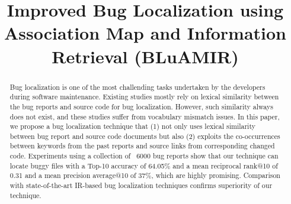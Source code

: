 \documentclass[conference]{IEEEtran}
\begin{document}
\title{Improved Bug Localization using Association Map and Information Retrieval (BLuAMIR)\\
}

\author{

}

\maketitle

\begin{abstract}
Bug localization is one of the most challending tasks undertaken by the developers during software maintenance.
Existing studies mostly rely on lexical similarity between the bug reports and source code for bug localization.
However, such similarity always does not exist, and these studies suffer from vocabulary mismatch issues.
In this paper, we propose a bug localization technique that (1) not only uses lexical similarity between bug report and source code documents  
but also (2) exploits the co-occurrences between keywords from the past reports and source links from corresponding changed code.
Experiments using a collection of ~6000 bug reports show that our technique can locate buggy files with a Top-10 accuracy of 64.05\% and a mean reciprocal rank@10 of 0.31 and a mean precision average@10 of 37\%, which are highly promising. 
Comparison with state-of-the-art IR-based bug localization techniques confirms superiority of our technique. 
\end{abstract}
\end{document}
